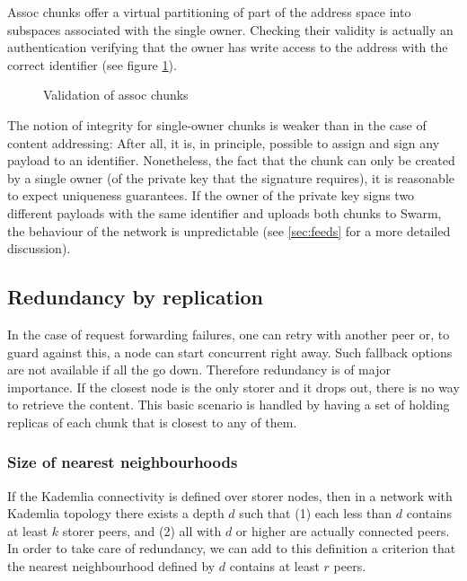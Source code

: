 Assoc chunks offer a virtual partitioning of part of the address space into subspaces associated with the single owner. Checking their validity is actually an authentication verifying that the owner has write access to the address with the correct identifier (see figure \ref{fig:assoc-integrity}). 

\begin{figure}[htbp]
   \centering
   \caption[Validation of assoc chunks]{Validation of assoc chunks}
   \label{fig:assoc-integrity}
\end{figure}

The notion of integrity for single-owner chunks is weaker than in the case of content addressing: After all, it is, in principle, possible to assign and sign any payload to an identifier. Nonetheless, the fact that the chunk can only be created by a single owner (of the private key that the signature requires), it is reasonable to expect uniqueness guarantees. If the owner of the private key signs two different payloads with the same identifier and uploads both chunks to Swarm, the behaviour of the network is unpredictable (see \ref{sec:feeds} for a  more detailed discussion).


\subsection{Redundancy by replication}\label{sec:redundancy-by-local-replication}

In the case of request forwarding failures, one can retry with another peer or, to guard against this, a node can start concurrent  right away. Such fallback options are not available if all the  go down. Therefore redundancy is of major importance. If the closest node is the only storer and it drops out, there is no way to retrieve the content. This basic scenario is handled by having a set of  holding replicas of each chunk that is closest to any of them. 

\subsubsection{Size of nearest neighbourhoods}

If the Kademlia connectivity is defined over storer nodes, then in a network with Kademlia topology there exists a depth $d$ such that (1) each  less than $d$ contains at least $k$ storer peers, and (2) all  with  $d$ or higher are actually connected peers. In order to take care of redundancy, we can add to this definition a criterion that the nearest neighbourhood defined by $d$ contains at least $r$ peers.

